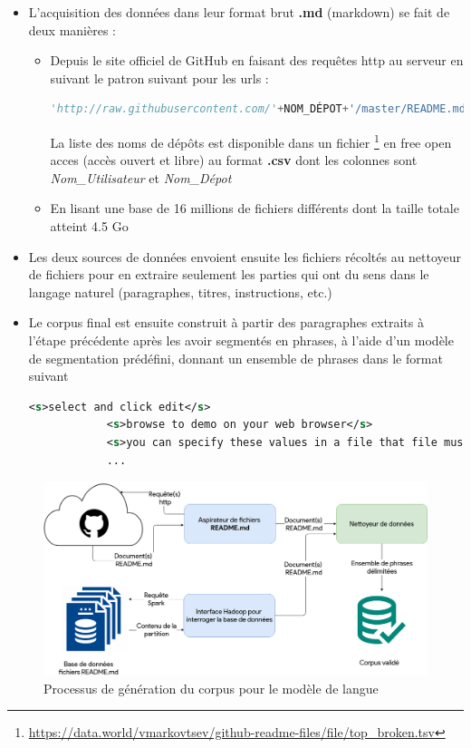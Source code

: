 		\begin{itemize}
			\item L'acquisition des données dans leur format brut \textbf{.md} (markdown) se fait de deux manières :
			\begin{itemize}
				\item Depuis le site officiel de GitHub en faisant des requêtes http au serveur en suivant le patron suivant pour les urls : 
				\begin{lstlisting}[language=python]
				'http://raw.githubusercontent.com/'+NOM_DÉPOT+'/master/README.md'\end{lstlisting}
				La liste des noms de dépôts est disponible dans un fichier \footnote{\url{https://data.world/vmarkovtsev/github-readme-files/file/top_broken.tsv}} en free open acces (accès ouvert et libre) au format \textbf{.csv} dont les colonnes sont \textit{Nom\_Utilisateur} et \textit{Nom\_Dépot} 
				\item En lisant une base de 16 millions de fichiers différents dont la taille totale atteint 4.5 Go  
			\end{itemize}
			\item Les deux sources de données envoient ensuite les fichiers récoltés au nettoyeur de fichiers pour en extraire seulement les parties qui ont du sens dans le langage naturel (paragraphes, titres, instructions, etc.)
			\item Le corpus final est ensuite construit à partir des paragraphes extraits à l'étape précédente après les avoir segmentés en phrases, à l'aide d'un modèle de segmentation prédéfini, donnant un ensemble de phrases dans le format suivant \begin{lstlisting}[language=xml]
			<s>select and click edit</s>
			<s>browse to demo on your web browser</s>
			<s>you can specify these values in a file that file must be home</s>
			...\end{lstlisting}
		\end{itemize}
	
	\begin{figure}[H] 
		\label{fig:lm_gathering}
		\centering
		\includegraphics[width=0.88\linewidth]{images/Conception/ASR/lm_gathering.png}
		\caption{Processus de génération du corpus pour le modèle de langue}
	\end{figure}
